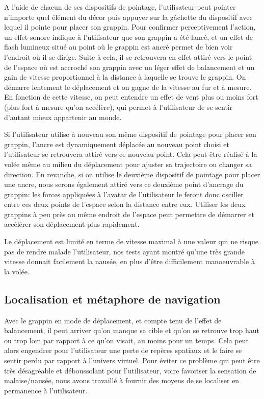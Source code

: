 \documentclass[a4paper]{elsarticle}
\begin{document}
A l’aide de chacun de ses dispositifs de pointage, l’utilisateur peut pointer n’importe quel élément du décor puis appuyer sur la gâchette du dispositif avec lequel il pointe pour placer son grappin. Pour confirmer perceptivement l’action, un effet sonore indique à l’utilisateur que son grappin a été lancé, et un effet de flash lumineux situé au point où le grappin est ancré permet de bien voir l’endroit où il se dirige. Suite à cela, il se retrouvera en effet attiré vers le point de l’espace où est accroché son grappin avec un léger effet de balancement et un gain de vitesse proportionnel à la distance à laquelle se trouve le grappin. On démarre lentement le déplacement et on gagne de la vitesse au fur et à mesure. En fonction de cette vitesse, on peut entendre un effet de vent plus ou moins fort (plus fort à mesure qu’on accélère), qui permet à l’utilisateur de se sentir d’autant mieux appartenir au monde.

Si l’utilisateur utilise à nouveau son même dispositif de pointage pour placer son grappin, l’ancre est dynamiquement déplacée au nouveau point choisi et l’utilisateur se retrouvera attiré vers ce nouveau point. Cela peut être réalisé à la volée même au milieu du déplacement pour ajuster sa trajectoire ou changer sa direction. En revanche, si on utilise le deuxième dispositif de pointage pour placer une ancre, nous serons également attiré vers ce deuxième point d’ancrage du grappin: les forces appliquées à l’avatar de l’utilisateur le feront donc osciller entre ces deux points de l’espace selon la distance entre eux. Utiliser les deux grappins à peu près au même endroit de l’espace peut permettre de démarrer et accélérer son déplacement plus rapidement.

Le déplacement est limité en terme de vitesse maximal à une valeur qui ne risque pas de rendre malade l’utilisateur, nos tests ayant montré qu’une très grande vitesse donnait facilement la nausée, en plus d’être difficilement manoeuvrable à la volée.

\subsection{Localisation et métaphore de navigation}

Avec le grappin en mode de déplacement, et compte tenu de l’effet de balancement, il peut arriver qu’on manque sa cible et qu’on se retrouve trop haut ou trop loin par rapport à ce qu’on visait, au moins pour un temps. Cela peut alors engendrer pour l’utilisateur une perte de repères spatiaux et le faire se sentir perdu par rapport à l’univers virtuel. Pour éviter ce problème qui peut être très désagréable et déboussolant pour l’utilisateur, voire favoriser la sensation de malaise/nausée, nous avons travaillé à fournir des moyens de se localiser en permanence à l’utilisateur.
\end{document}
